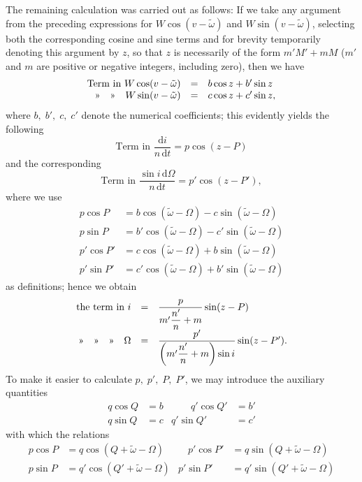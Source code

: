 \par\noindent\hspace*{\parindent}The remaining calculation was carried out as follows: If we take any argument from the preceding expressions for \(W\cos(v-\tilde\omega)\) and \(W\sin(v-\tilde\omega)\), selecting both the corresponding cosine and sine terms and for brevity temporarily denoting this argument by \(z\), so that \(z\) is necessarily of the form \(m'M'+mM\) (\(m'\) and \(m\) are positive or negative integers, including zero), then we have
\[
\begin{array}{rcl}
\text{Term in }W\cos(v-\tilde\omega)&=&b\cos z+b'\sin z\\
\text{»\quad »\quad }W\sin(v-\tilde\omega)&=&c\cos z+c'\sin z,
\end{array}
\]
\noindent where \(b,\;b',\;c,\;c'\) denote the numerical coefficients; this evidently yields the following
\[
\text{Term in }\frac{\mathrm{d}i}{n\,\mathrm{d}t}=p\cos(z-P)
\]
\noindent and the corresponding
\[
\text{Term in }\frac{\sin i\,\mathrm{d}\Omega}{n\,\mathrm{d}t}=p'\cos(z-P'),
\]
\noindent where we use
\[
\begin{aligned}
p\cos P&=b\cos(\tilde\omega-\Omega)-c\sin(\tilde\omega-\Omega)\\
p\sin P&=b'\cos(\tilde\omega-\Omega)-c'\sin(\tilde\omega-\Omega)\\
p'\cos P'&=c\cos(\tilde\omega-\Omega)+b\sin(\tilde\omega-\Omega)\\
p'\sin P'&=c'\cos(\tilde\omega-\Omega)+b'\sin(\tilde\omega-\Omega)
\end{aligned}
\]
\noindent as definitions; hence we obtain
\[
\begin{array}{rcl}
\text{the term in }i&=&\dfrac{p}{m'\dfrac{n'}{n}+m}\sin(z-P)\\[8pt]
\text{»\quad »\quad »\quad }\Omega&=&\dfrac{p'}{\left(m'\dfrac{n'}{n}+m\right)\sin i}\sin(z-P').
\end{array}
\]
\noindent To make it easier to calculate \(p,\;p',\;P,\;P'\), we may introduce the auxiliary quantities
\[
\begin{aligned}
q\cos Q&=b&\qquad q'\cos Q'&=b'\\
q\sin Q&=c& q'\sin Q'&=c'
\end{aligned}
\]
\noindent with which the relations
\[
\begin{aligned}
p\cos P&=q\cos(Q+\tilde\omega-\Omega)&\quad p'\cos P'&=q\sin(Q+\tilde\omega-\Omega)\\
p\sin P&=q'\cos(Q'+\tilde\omega-\Omega)&p'\sin P'&=q'\sin(Q'+\tilde\omega-\Omega)
\end{aligned}
\]
